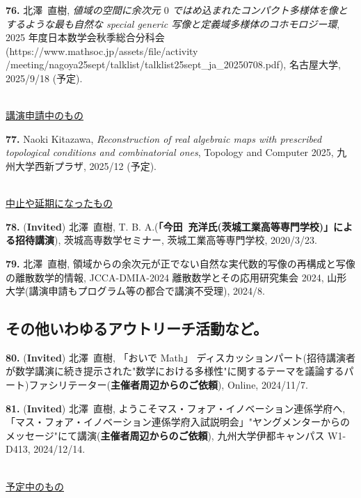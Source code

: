 \documentclass{article}
\begin{document}
\par\noindent
{\bf 76.} 北澤\ 直樹, \textsl{値域の空間に余次元 $0$ ではめ込まれたコンパクト多様体を像とするような最も自然な special generic 写像と定義域多様体のコホモロジー環},  2025 年度日本数学会秋季総合分科会\\(https://www.mathsoc.jp/assets/file/activity\\
/meeting/nagoya25sept/talklist/talklist25sept\_ja\_20250708.pdf), 名古屋大学, 2025/9/18 (予定).


 \ \\
\noindent\underline{講演申請中のもの} \\
\par\noindent


\par\noindent
{\bf 77.} Naoki Kitazawa, \textsl{Reconstruction of real algebraic maps with prescribed topological conditions and combinatorial ones},  Topology and Computer 2025, 九州大学西新プラザ, 2025/12 (予定).

\ \\
\noindent\underline{中止や延期になったもの} \\
\par\noindent
{\bf 78.}  ({\bf  Invited})  北澤\ 直樹, T. B. A.{\rm (}{\bf 「今田\ 充洋\quad 氏(茨城工業高等専門学校)」による招待講演}{\rm )}, 茨城高専数学セミナー, 茨城工業高等専門学校,  2020/3/23.

\par\noindent
{\bf 79.} 北澤\ 直樹, 領域からの余次元が正でない自然な実代数的写像の再構成と写像の離散数学的情報, JCCA-DMIA-2024 離散数学とその応用研究集会 2024, 山形大学(講演申請もプログラム等の都合で講演不受理), 2024/8. 

\subsection{その他いわゆるアウトリーチ活動など。}

{\bf 80.}
({\bf Invited}) 北澤\ 直樹, 「おいで Math」 ディスカッションパート(招待講演者が数学講演に続き提示された"数学における多様性"に関するテーマを議論するパート)ファシリテーター({\bf 主催者周辺からのご依頼}), Online, 2024/11/7. \\

\par\noindent
{\bf 81.}
({\bf Invited}) 北澤\ 直樹, ようこそマス・フォア・イノベーション連係学府へ, 「マス・フォア・イノベーション連係学府入試説明会」"ヤングメンターからのメッセージ"にて講演({\bf 主催者周辺からのご依頼}), 九州大学伊都キャンパス W1-D413, 2024/12/14.

\ \\
\noindent\underline{予定中のもの} \\
%
%
%
%
\end{document}
